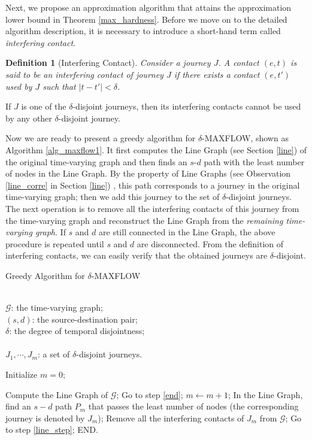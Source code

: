 \documentclass[10pt, conference, letterpaper]{IEEEtran}
\newtheorem{definition}{Definition}
\begin{document}
Next, we propose an approximation algorithm that attains the approximation lower bound in Theorem \ref{max_hardness}. Before we move on to the detailed algorithm description, it is necessary to introduce a short-hand term called \emph{interfering contact}.

\begin{definition}[{Interfering Contact}]
Consider a journey $J$. A contact $(e,t)$ is said to be an interfering contact of journey $J$ if there exists a contact $(e,t')$ used by $J$ such that $|t-t'|<\delta$.
\end{definition}

\noindent If $J$ is one of the $\delta$-disjoint journeys, then its interfering contacts cannot be used by any other $\delta$-disjoint journey.

Now we are ready to present a greedy algorithm for $\delta$-MAXFLOW, shown as Algorithm \ref{alg_maxflow1}. It first computes the Line Graph (see Section \ref{line}) of the original time-varying graph and then finds an $s$-$d$ path with the least number of nodes in the Line Graph. By the property of Line Graphs (see Observation \ref{line_corre} in Section \ref{line}) , this path corresponds to a journey in the original time-varying graph; then we add this journey to the set of $\delta$-disjoint journeys. The next operation is to remove all the interfering contacts of this journey from the time-varying graph and reconstruct the Line Graph from the \emph{remaining time-varying graph}. If $s$ and $d$ are still connected in the Line Graph, the above procedure is repeated until $s$ and $d$ are disconnected. From the definition of interfering contacts, we can easily  verify that the obtained journeys are $\delta$-disjoint.
\begin{algorithm}[ht]
 \caption{Greedy Algorithm for $\delta$-MAXFLOW}\label{alg_maxflow1}
    \begin{algorithmic}[1]
\REQUIRE ~~\\

$\mathcal{G}$: the time-varying graph;\\
$(s,d)$: the source-destination pair;\\
$\delta$: the degree of temporal disjointness;\\

\ENSURE ~~\\

$J_1,\cdots,J_m$: a set of $\delta$-disjoint journeys.

\vspace{1mm}

\STATE Initialize $m=0$;

\STATE Compute the Line Graph of $\mathcal{G}$;\label{line_step}
\STATE Go to step \ref{end};
\ENDIF \label{a3}
\STATE $m\leftarrow m+1$;
\STATE In the Line Graph, find an $s-d$ path $P_m$ that passes the least number of nodes (the corresponding journey is denoted by $J_m$);\label{a1}
\STATE Remove all the interfering contacts of $J_m$ from $\mathcal{G}$;\label{a2}
\STATE Go to step \ref{line_step};
\STATE END.\label{end}
\end{algorithmic}
\end{algorithm}
\end{document}
